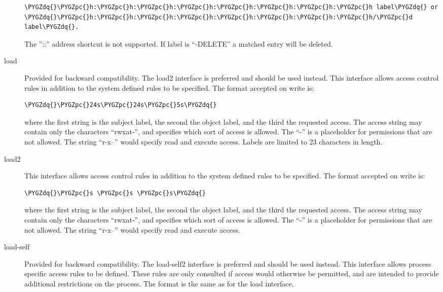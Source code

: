 \documentclass[a4paper,8pt,english]{sphinxmanual}
\def\PYGZpc{\char`\%}
\def\PYGZdq{\char`\"}
\begin{document}
\begin{description}
\begin{Verbatim}[commandchars=\\\{\}]
\PYGZdq{}\PYGZpc{}h:\PYGZpc{}h:\PYGZpc{}h:\PYGZpc{}h:\PYGZpc{}h:\PYGZpc{}h:\PYGZpc{}h:\PYGZpc{}h label\PYGZdq{} or
\PYGZdq{}\PYGZpc{}h:\PYGZpc{}h:\PYGZpc{}h:\PYGZpc{}h:\PYGZpc{}h:\PYGZpc{}h:\PYGZpc{}h:\PYGZpc{}h/\PYGZpc{}d label\PYGZdq{}.
\end{Verbatim}

The ''::'' address shortcut is not supported.
If label is ``-DELETE'' a matched entry will be deleted.

\item[{load}] \leavevmode
Provided for backward compatibility. The load2 interface
is preferred and should be used instead.
This interface allows access control rules in addition to
the system defined rules to be specified. The format accepted
on write is:

\begin{Verbatim}[commandchars=\\\{\}]
\PYGZdq{}\PYGZpc{}24s\PYGZpc{}24s\PYGZpc{}5s\PYGZdq{}
\end{Verbatim}

where the first string is the subject label, the second the
object label, and the third the requested access. The access
string may contain only the characters ``rwxat-'', and specifies
which sort of access is allowed. The ``-'' is a placeholder for
permissions that are not allowed. The string ``r-x--'' would
specify read and execute access. Labels are limited to 23
characters in length.

\item[{load2}] \leavevmode
This interface allows access control rules in addition to
the system defined rules to be specified. The format accepted
on write is:

\begin{Verbatim}[commandchars=\\\{\}]
\PYGZdq{}\PYGZpc{}s \PYGZpc{}s \PYGZpc{}s\PYGZdq{}
\end{Verbatim}

where the first string is the subject label, the second the
object label, and the third the requested access. The access
string may contain only the characters ``rwxat-'', and specifies
which sort of access is allowed. The ``-'' is a placeholder for
permissions that are not allowed. The string ``r-x--'' would
specify read and execute access.

\item[{load-self}] \leavevmode
Provided for backward compatibility. The load-self2 interface
is preferred and should be used instead.
This interface allows process specific access rules to be
defined. These rules are only consulted if access would
otherwise be permitted, and are intended to provide additional
restrictions on the process. The format is the same as for
the load interface.


\end{description}
\end{document}
